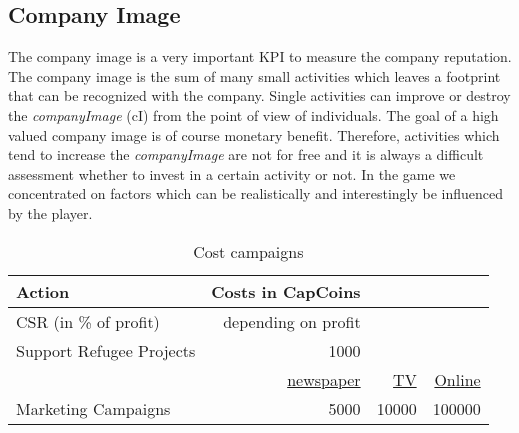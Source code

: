 \subsection{Company Image} \label{company_image}

The company image is a very important KPI to measure the company reputation. The company image is the sum of many small activities which leaves a footprint that can be recognized with the company. Single activities can improve or destroy the \textit{companyImage} (\gls{cI}) from the point of view of individuals. The goal of a high valued company image is of course monetary benefit. Therefore, activities which tend to increase the \textit{companyImage} are not for free and it is always a difficult assessment whether to invest in a certain activity or not. In the game we concentrated on factors which can be realistically and interestingly be influenced by the player.

\begin{table}[h]
\centering
\begin{tabular}{|l|r|r|r|}
\hline
\multicolumn{1}{|l|}{\textbf{Action}} & \multicolumn{1}{l}{\textbf{Costs in CapCoins}} & \multicolumn{1}{l}{} & \multicolumn{1}{l|}{} \\ \hline
CSR (in \% of profit)     & depending on profit &                   & \\
Support Refugee Projects  & 1000        &                   & \\
  & \underline{newspaper} & \underline{TV}      &  \underline{Online} \\
Marketing Campaigns       & 5000                & 10000             & 100000 \\
\hline
\end{tabular}
\caption{Cost campaigns}
\label{cost_campaigns}
\end{table}

